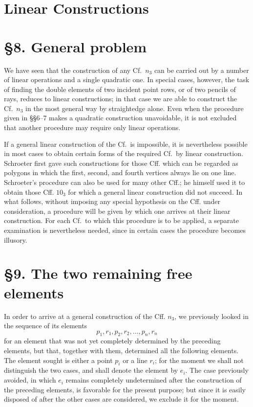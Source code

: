 \documentclass[11pt]{article}
\newcommand{\Cf}{\textup{Cf.}}
\begin{document}
\section*{Linear Constructions}
\section*{\S 8. General problem}
We have seen that the construction of any \Cf\ $n_3$ can be carried out by a number of linear operations and a single quadratic one. In special cases, however, the task of finding the double elements of two incident point rows, or of two pencils of rays, reduces to linear constructions; in that case we are able to construct the \Cf\ $n_3$ in the most general way by straightedge alone. Even when the procedure given in \S\S 6--7 makes a quadratic construction unavoidable, it is not excluded that another procedure may require only linear operations.

If a general linear construction of the \Cf\ is impossible, it is nevertheless possible in most cases to obtain certain forms of the required \Cf\ by linear construction. Schroeter first gave such constructions for those Cff. which can be regarded as polygons in which the first, second, and fourth vertices always lie on one line. Schroeter's procedure can also be used for many other Cff.; he himself used it to obtain those Cff. $10_3$ for which a general linear construction did not succeed. In what follows, without imposing any special hypothesis on the Cff. under consideration, a procedure will be given by which one arrives at their linear construction. For each \Cf\ to which this procedure is to be applied, a separate examination is nevertheless needed, since in certain cases the procedure becomes illusory.

\section*{\S 9. The two remaining free elements}
In order to arrive at a general construction of the Cff. $n_3$, we previously looked in the sequence of its elements
\[
p_1,r_1,p_2,r_2,\ldots,p_n,r_n
\]
for an element that was not yet completely determined by the preceding elements, but that, together with them, determined all the following elements. The element sought is either a point $p_i$ or a line $r_i$; for the moment we shall not distinguish the two cases, and shall denote the element by $e_i$. The case previously avoided, in which $e_i$ remains completely undetermined after the construction of the preceding elements, is favorable for the present purpose; but since it is easily disposed of after the other cases are considered, we exclude it for the moment.
\end{document}

